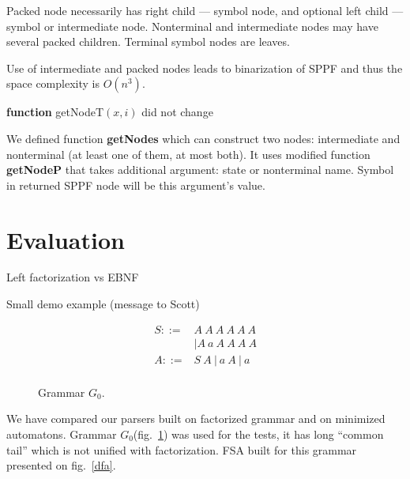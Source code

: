 \documentclass[runningheads,a4paper]{llncs}
\begin{document}
Packed node necessarily has right child --- symbol node, and optional left child --- symbol or intermediate node.
Nonterminal and intermediate nodes may have several packed children. 
Terminal symbol nodes are leaves.

Use of intermediate and packed nodes leads to binarization of SPPF and thus the space complexity is $O(n^{3})$.



\textbf{function} getNodeT$(x,i)$ did not change

We defined function \textbf{getNodes} which can construct two nodes: intermediate and nonterminal (at least one of them, at most both).
It uses modified function \textbf{getNodeP} that takes additional argument: state or nonterminal name. Symbol in returned SPPF node will be this argument's value.



\section{Evaluation}

Left factorization vs EBNF

Small demo example (message to Scott)

\begin{figure}[h]
$$
\begin{array}{crcl}
S ::=& A\ A\ A\ A\ A\ A \\
     &|A\ a\ A\ A\ A\ A \\
A ::=& S\ A\ |\ a\ A\ |\ a \\
\end{array}
$$
\caption{Grammar $G_0$.}
\label{testGrammar}
\end{figure}

We have compared our parsers built on factorized grammar and on minimized automatons.
Grammar $G_0$(fig.~\ref{testGrammar}) was used for the tests,
it has long ``common tail'' which is not unified with factorization.
FSA built for this grammar presented on fig.~\ref{dfa}.
\end{document}
